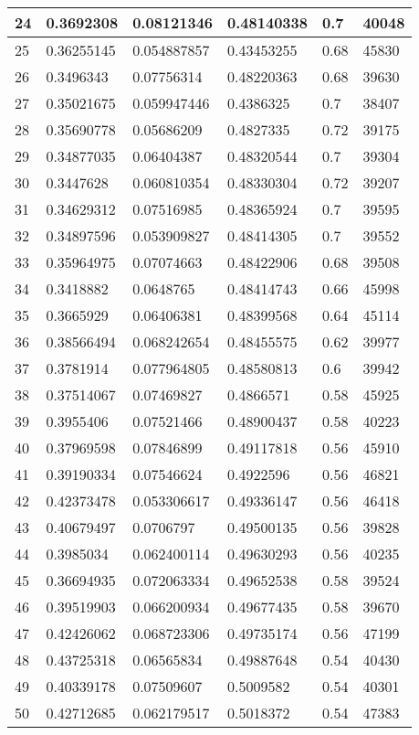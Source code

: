 \begin{longtable}{|l|l|l|l|l|l|}
24 & 0.3692308 & 0.08121346 & 0.48140338 & 0.7 & 40048 \\ \hline 
25 & 0.36255145 & 0.054887857 & 0.43453255 & 0.68 & 45830 \\ \hline 
26 & 0.3496343 & 0.07756314 & 0.48220363 & 0.68 & 39630 \\ \hline 
27 & 0.35021675 & 0.059947446 & 0.4386325 & 0.7 & 38407 \\ \hline 
28 & 0.35690778 & 0.05686209 & 0.4827335 & 0.72 & 39175 \\ \hline 
29 & 0.34877035 & 0.06404387 & 0.48320544 & 0.7 & 39304 \\ \hline 
30 & 0.3447628 & 0.060810354 & 0.48330304 & 0.72 & 39207 \\ \hline 
31 & 0.34629312 & 0.07516985 & 0.48365924 & 0.7 & 39595 \\ \hline 
32 & 0.34897596 & 0.053909827 & 0.48414305 & 0.7 & 39552 \\ \hline 
33 & 0.35964975 & 0.07074663 & 0.48422906 & 0.68 & 39508 \\ \hline 
34 & 0.3418882 & 0.0648765 & 0.48414743 & 0.66 & 45998 \\ \hline 
35 & 0.3665929 & 0.06406381 & 0.48399568 & 0.64 & 45114 \\ \hline 
36 & 0.38566494 & 0.068242654 & 0.48455575 & 0.62 & 39977 \\ \hline 
37 & 0.3781914 & 0.077964805 & 0.48580813 & 0.6 & 39942 \\ \hline 
38 & 0.37514067 & 0.07469827 & 0.4866571 & 0.58 & 45925 \\ \hline 
39 & 0.3955406 & 0.07521466 & 0.48900437 & 0.58 & 40223 \\ \hline 
40 & 0.37969598 & 0.07846899 & 0.49117818 & 0.56 & 45910 \\ \hline 
41 & 0.39190334 & 0.07546624 & 0.4922596 & 0.56 & 46821 \\ \hline 
42 & 0.42373478 & 0.053306617 & 0.49336147 & 0.56 & 46418 \\ \hline 
43 & 0.40679497 & 0.0706797 & 0.49500135 & 0.56 & 39828 \\ \hline 
44 & 0.3985034 & 0.062400114 & 0.49630293 & 0.56 & 40235 \\ \hline 
45 & 0.36694935 & 0.072063334 & 0.49652538 & 0.58 & 39524 \\ \hline 
46 & 0.39519903 & 0.066200934 & 0.49677435 & 0.58 & 39670 \\ \hline 
47 & 0.42426062 & 0.068723306 & 0.49735174 & 0.56 & 47199 \\ \hline 
48 & 0.43725318 & 0.06565834 & 0.49887648 & 0.54 & 40430 \\ \hline 
49 & 0.40339178 & 0.07509607 & 0.5009582 & 0.54 & 40301 \\ \hline 
50 & 0.42712685 & 0.062179517 & 0.5018372 & 0.54 & 47383 \\ \hline 
\end{longtable}
